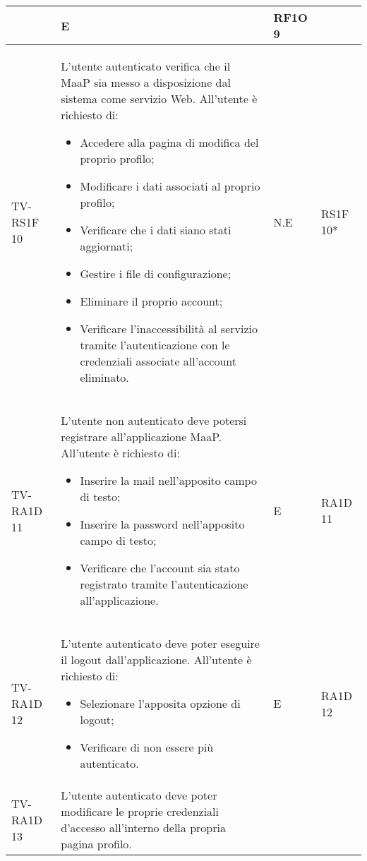 \begin{center}
\begin{longtable}{| p{3cm} | p{6cm} | p{1.5cm} | p{2cm} | }
\begin{itemize}
\end{itemize} & E & RF1O 9 \newline  \\ \hline 
				TV-RS1F 10 & 
				L'utente autenticato verifica che il \glossario{framework} MaaP sia messo a disposizione dal sistema \glossario{MaaS} come servizio Web.
\newline
All'utente è richiesto di:
\begin{itemize}
\item Accedere alla pagina di modifica del proprio profilo;
\item Modificare i dati associati al proprio profilo;
\item Verificare che i dati siano stati aggiornati;
\item Gestire i file di configurazione;
\item Eliminare il proprio account;
\item Verificare l'inaccessibilità al servizio tramite l'autenticazione con le credenziali associate all'account eliminato.
\end{itemize} & N.E & RS1F 10* \newline  \\ \hline 
				TV-RA1D 11 & 
				L'utente non autenticato deve potersi registrare all'applicazione MaaP.
\newline
All'utente è richiesto di:
\begin{itemize}
\item Inserire la mail nell'apposito campo di testo;
\item Inserire la password nell'apposito campo di testo;
\item Verificare che l'account sia stato registrato tramite l'autenticazione all'applicazione.
\end{itemize} & E & RA1D 11\newline  \\ \hline 
				TV-RA1D 12 & 
				L'utente autenticato deve poter eseguire il logout dall'applicazione.
\newline
All'utente è richiesto di:
\begin{itemize}
\item Selezionare l'apposita opzione di logout;
\item Verificare di non essere più autenticato.
\end{itemize} & E & RA1D 12\newline  \\ \hline 
				TV-RA1D 13 & 
				L'utente autenticato deve poter modificare le proprie credenziali d'accesso all'interno della propria pagina profilo.

\end{longtable}
\end{center}
